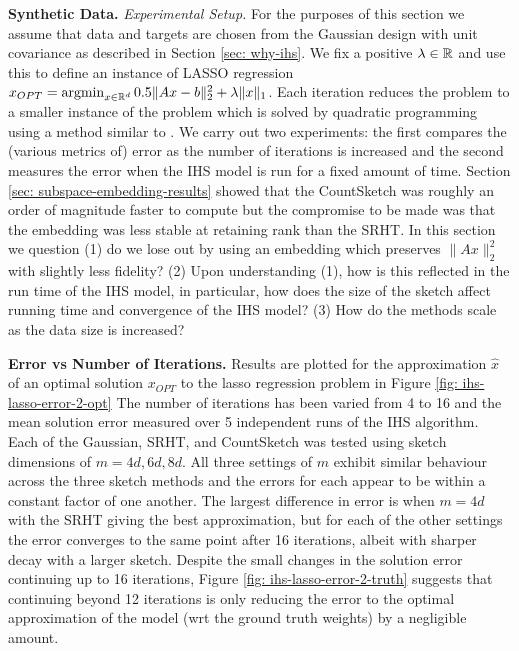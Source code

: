 
\textbf{Synthetic Data.}
\textit{Experimental Setup.}
For the purposes of this section we assume that data and targets are chosen
from the Gaussian design with unit covariance as described in Section
\ref{sec: why-ihs}.
We fix a positive $\lambda \in \mathbb{R}$ and use this to define an instance of LASSO
regression $x_{OPT} = \operatorname*{argmin}_{x \in \mathbb{R}^d} 0.5 \|Ax - b\|_2^2 + \lambda \|x\|_1$.
Each iteration reduces the problem to a smaller instance of the problem which
is solved by quadratic programming using a method similar to \cite{gaines2018algorithms}.
We carry out two experiments: the first compares the (various metrics of) error
as the number of iterations is increased and the second measures the error
when the IHS model is run for a fixed amount of time.
Section
\ref{sec: subspace-embedding-results} showed that the CountSketch was roughly
an order of magnitude faster to compute but the compromise to be made was that
the embedding was less stable at retaining rank than the SRHT.
In this section we question (1) do we lose out by using an embedding which
preserves $\|Ax\|_2^2$ with slightly less fidelity?
(2) Upon understanding (1), how is this reflected in the run time of the
IHS model, in particular, how does the size of the sketch affect running time
and convergence of the IHS model?
(3) How do the methods scale as the data size is increased?






\noindent
\textbf{Error vs Number of Iterations.}
Results are plotted for the approximation $\hat{x}$ of an optimal solution $x_{OPT}$
to the lasso regression problem in Figure \ref{fig: ihs-lasso-error-2-opt}
The number of iterations has been varied from 4 to 16 and the mean solution error measured
over 5 independent runs of the IHS algorithm.
Each of the Gaussian, SRHT, and CountSketch was tested using sketch dimensions
of $m=4d, 6d, 8d$.
All three settings of $m$ exhibit similar behaviour across the three sketch
methods and the errors for each appear to be within a constant factor of
one another.
The largest difference in error is when $m=4d$ with the SRHT giving the best
approximation, but for each of the other settings the error converges to the
same point after 16 iterations, albeit with sharper decay with a larger sketch.
Despite the small changes in the solution error continuing up to 16 iterations,
Figure \ref{fig: ihs-lasso-error-2-truth} suggests that continuing beyond 12
iterations is only reducing the
error to the optimal approximation of the model (wrt the ground truth weights)
by a negligible amount.

